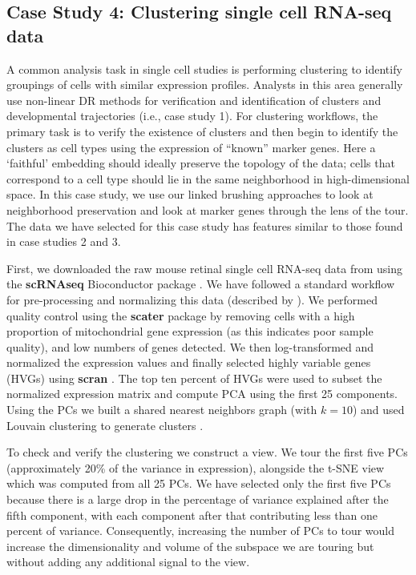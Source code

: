 \documentclass[article,notitle]{jdssv}
\begin{document}
\hypertarget{case-study-4-clustering-single-cell-rna-seq-data}{%
\subsection{Case Study 4: Clustering single cell RNA-seq data}\label{case-study-4-clustering-single-cell-rna-seq-data}}

A common analysis task in single cell studies is performing clustering to
identify groupings of cells with similar expression profiles. Analysts
in this area generally use non-linear DR methods for verification and identification
of clusters and developmental trajectories (i.e., case study 1). For clustering
workflows, the primary task is to verify the existence of clusters and then begin to
identify the clusters as cell types using the expression of ``known''
marker genes. Here a `faithful' embedding should ideally preserve the topology
of the data; cells that correspond to a cell type should lie in the same
neighborhood in high-dimensional space. In this case study, we use our
linked brushing approaches to look at neighborhood preservation
and look at marker genes through the lens of the tour. The data we have
selected for this case study has features similar to those found in case studies
2 and 3.

First, we downloaded the raw mouse retinal single cell RNA-seq data from
\citet{Macosko2015-ot} using the \textbf{scRNAseq} Bioconductor package \citep{scRNAseq-d}. We
have followed a standard workflow for pre-processing and normalizing this data
(described by \citet{Amezquita2020-at}). We performed quality control using the \textbf{scater} package
by removing cells with a high proportion of mitochondrial gene expression (as this indicates poor sample quality), and low
numbers of genes detected. We then log-transformed and normalized the expression
values and finally selected highly variable genes (HVGs) using \textbf{scran}
\citep{McCarthy2017, Lun2016}. The top ten percent of HVGs were used to subset
the normalized expression matrix and compute PCA using the first 25 components.
Using the PCs we built a shared nearest neighbors graph (with \(k = 10\)) and
used Louvain clustering to generate clusters \citep{Blondel2008-bx}.

To check and verify the clustering we construct a  view.
We tour the first five PCs (approximately 20\% of the variance in expression),
alongside the t-SNE view which was computed from all 25 PCs. We have selected only the first five PCs because there is a large drop in the percentage of variance explained after the fifth component, with each component after that contributing less than one percent of variance.
Consequently, increasing the number of PCs to tour would increase the dimensionality and volume of the subspace we are touring but without adding any additional signal to the view.
\end{document}
